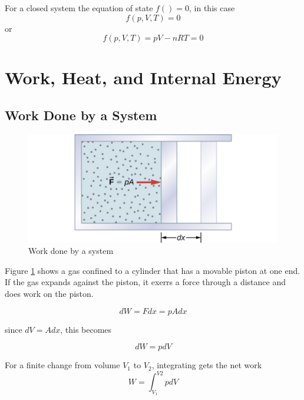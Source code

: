\documentclass[14pt]{memoir}
\begin{document}
For a closed system the equation of state $f() = 0$, in this case
\begin{equation}
f(p,V,T) = 0
\end{equation}
or
\begin{equation}
f(p,V,T) = pV - nRT = 0
\end{equation}


\section{Work, Heat, and Internal Energy}

\subsection{Work Done by a System}

\begin{figure}[H]
\begin{center}
\includegraphics[scale=.6]{fig/fig_03_04.jpg}
\caption{Work done by a system}
\label{fig:03_04}
\end{center}
\end{figure}

Figure \ref{fig:03_04} shows a gas confined to a cylinder that has a movable piston at one end. If the gas expands against the piston, it exerrs a force through a distance and does work on the piston. 

\begin{equation}
dW = F dx = p A dx
\end{equation}

since $dV = A dx$, this becomes

\begin{equation}
dW = p dV
\end{equation}

For a finite change from volume $V_1$ to $V_2$, integrating gets the net work
\begin{equation}
W = \int_{V_1}^{V2} p dV
\end{equation}
\end{document}
